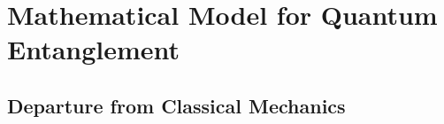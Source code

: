 \section{Mathematical Model for Quantum Entanglement}%
\label{sec:Mathematical Model for Quantum Entanglement}

\subsection{Departure from Classical Mechanics}%
\label{sub:Departure from Classical Mechanics}



